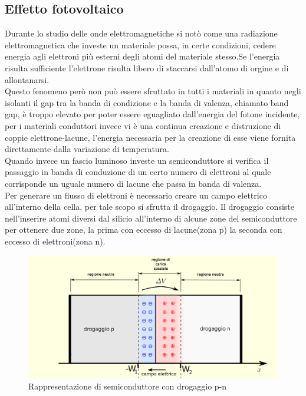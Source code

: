 \subsection{Effetto fotovoltaico}
Durante lo studio delle onde elettromagnetiche si notò come una radiazione elettromagnetica che investe un materiale possa, in certe condizioni, cedere energia agli elettroni più esterni degli atomi del materiale stesso.Se l'energia risulta sufficiente l'elettrone risulta libero di staccarsi dall'atomo di orgine e di allontanarsi.\\
Questo fenomeno però non può essere sfruttato in tutti i materiali in quanto negli isolanti il gap tra la banda di condizione e la banda di valenza, chiamato band gap, è troppo elevato per poter essere eguagliato dall'energia del fotone incidente, per i materiali conduttori invece vi è una continua creazione e distruzione di coppie elettrone-lacune, l'energia necessaria per la creazione di esse viene fornita direttamente dalla variazione di temperatura.\\
Quando invece un fascio luminoso investe un semiconduttore si verifica il passaggio in banda di conduzione di un certo numero di elettroni al quale corrisponde un uguale numero di lacune che passa in banda di valenza.\\
Per generare un flusso di elettroni è necessario creare un campo elettrico all'interno della cella, per tale scopo si sfrutta il drogaggio. Il drogaggio consiste nell'inserire atomi diversi dal silicio all'interno di alcune zone del semiconduttore per ottenere due zone, la prima con eccesso di lacune(zona p) la seconda con eccesso di elettroni(zona n).\\
\begin{figure}[H]
    \centering
    \includegraphics[height=0.5\textwidth]{res/cap 3/drogaggio.png}
    \caption{Rappresentazione di semiconduttore con drogaggio p-n}
\end{figure}\noindent
